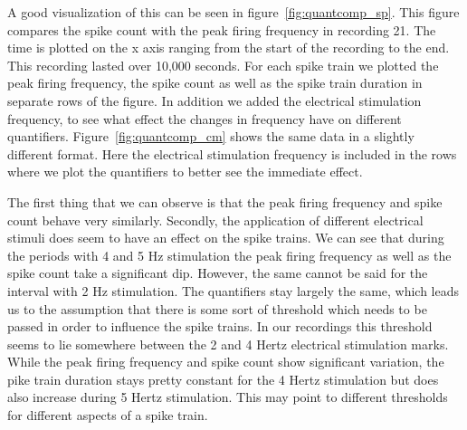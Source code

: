 A good visualization of this can be seen in figure~\ref{fig:quantcomp_sp}. This figure compares the spike count with the peak firing frequency in recording 21. The time is plotted on the x axis ranging from the start of the recording to the end. This recording lasted over 10,000 seconds. For each spike train we plotted the peak firing frequency, the spike count as well as the spike train duration in separate rows of the figure. In addition we added the electrical stimulation frequency, to see what effect the changes in frequency have on different quantifiers. Figure~\ref{fig:quantcomp_cm} shows the same data in a slightly different format. Here the electrical stimulation frequency is included in the rows where we plot the quantifiers to better see the immediate effect.

The first thing that we can observe is that the peak firing frequency and spike count behave very similarly. Secondly, the application of different electrical stimuli does seem to have an effect on the spike trains. We can see that during the periods with 4 and 5 Hz stimulation the peak firing frequency as well as the spike count take a significant dip. However, the same cannot be said for the interval with 2 Hz stimulation. The quantifiers stay largely the same, which leads us to the assumption that there is some sort of threshold which needs to be passed in order to influence the spike trains. In our recordings this threshold seems to lie somewhere between the 2 and 4 Hertz electrical stimulation marks.
While the peak firing frequency and spike count show significant variation, the pike train duration stays pretty constant for the 4 Hertz stimulation but does also increase during 5 Hertz stimulation. This may point to different thresholds for different aspects of a spike train.

